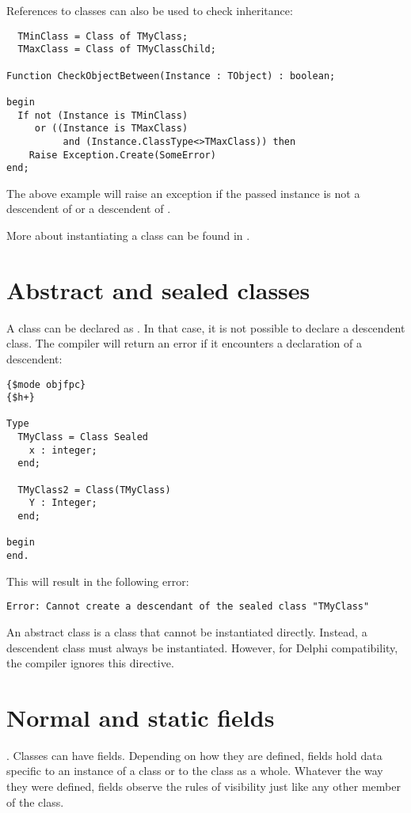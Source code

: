 References to classes can also be used to check inheritance:
\begin{verbatim}
  TMinClass = Class of TMyClass;
  TMaxClass = Class of TMyClassChild;

Function CheckObjectBetween(Instance : TObject) : boolean;

begin
  If not (Instance is TMinClass)
     or ((Instance is TMaxClass)
          and (Instance.ClassType<>TMaxClass)) then
    Raise Exception.Create(SomeError)
end;
\end{verbatim}
The above example will raise an exception if the passed instance
is not a descendent of  or a descendent of .

More about instantiating a class can be found in .

\section{Abstract and sealed classes}
A class can be declared as . In that case, it is not possible to
declare a descendent class. The compiler will return an error if it
encounters a declaration of a descendent:
\begin{verbatim}
{$mode objfpc}
{$h+}

Type
  TMyClass = Class Sealed
    x : integer;
  end;

  TMyClass2 = Class(TMyClass)
    Y : Integer;
  end;

begin
end.
\end{verbatim}
This will result in the following error:
\begin{verbatim}
Error: Cannot create a descendant of the sealed class "TMyClass"
\end{verbatim}

An abstract class is a class that cannot be instantiated directly. Instead,
a descendent class must always be instantiated.
However, for Delphi compatibility, the compiler ignores this directive.

\section{Normal and static fields}
\label{se:classfields}.
Classes can have fields. Depending on how they are defined, fields hold data specific to
an instance of a class or to the class as a whole. Whatever the way they were defined,
fields observe the rules of visibility just like any other member of the class.

